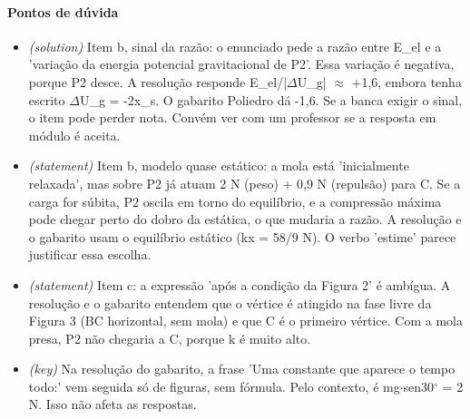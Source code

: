 \documentclass{article}%
\begin{document}
\paragraph{Pontos de dúvida}%
\begin{itemize}%
\item%
\textit{(solution)} Item b, sinal da razão: o enunciado pede a razão entre E\_el e a 'variação da energia potencial gravitacional de P2'. Essa variação é negativa, porque P2 desce. A resolução responde E\_el/|$\Delta$U\_g| $\approx$ +1,6, embora tenha escrito $\Delta$U\_g = -2x\_s. O gabarito Poliedro dá -1,6. Se a banca exigir o sinal, o item pode perder nota. Convém ver com um professor se a resposta em módulo é aceita.%
\item%
\textit{(statement)} Item b, modelo quase estático: a mola está 'inicialmente relaxada', mas sobre P2 já atuam 2 N (peso) + 0,9 N (repulsão) para C. Se a carga for súbita, P2 oscila em torno do equilíbrio, e a compressão máxima pode chegar perto do dobro da estática, o que mudaria a razão. A resolução e o gabarito usam o equilíbrio estático (kx = 58/9 N). O verbo 'estime' parece justificar essa escolha.%
\item%
\textit{(statement)} Item c: a expressão 'após a condição da Figura 2' é ambígua. A resolução e o gabarito entendem que o vértice é atingido na fase livre da Figura 3 (BC horizontal, sem mola) e que C é o primeiro vértice. Com a mola presa, P2 não chegaria a C, porque k é muito alto.%
\item%
\textit{(key)} Na resolução do gabarito, a frase 'Uma constante que aparece o tempo todo:' vem seguida só de figuras, sem fórmula. Pelo contexto, é mg$\cdot$sen30$^\circ$ = 2 N. Isso não afeta as respostas.%
\end{itemize}%
\end{document}
